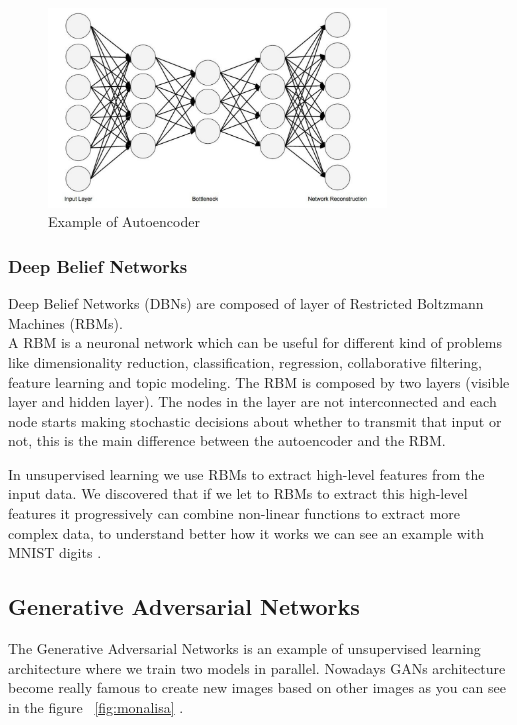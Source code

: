 \begin{figure}[H]
\centering
\includegraphics[width=0.8\textwidth]{./figures/autoencoder}
\caption{Example of Autoencoder \cite{dp4j-deep-learning}}
\label{fig:autoencoder}
\end{figure}


\subsubsection[Deep Belief Networks]{Deep Belief Networks}
Deep Belief Networks (DBNs) are composed of layer of Restricted Boltzmann Machines (RBMs).\\
A RBM is a neuronal network which can be useful for different kind of problems like dimensionality reduction, classification, regression, collaborative filtering, feature learning and topic modeling. The RBM is composed by two layers (visible layer and hidden layer). The nodes in the layer are not interconnected and each node starts making  stochastic decisions about whether to transmit that input or not, this is the main difference between the autoencoder and the RBM.

In unsupervised learning we use RBMs to extract high-level features from the input data. We discovered that if we let to RBMs to extract this high-level features it progressively can combine non-linear functions to extract more complex data, to understand better how it works we can see an example with MNIST digits \cite{dp4j-deep-learning}.

\subsection[Generative Adversarial Networks]{Generative Adversarial Networks}
The Generative Adversarial Networks is an example of unsupervised learning architecture where we train two models in parallel. Nowadays GANs architecture become really famous to create new images based on other images as you can see in the figure ~\ref{fig:monalisa} \cite{dp4j-deep-learning}. 

